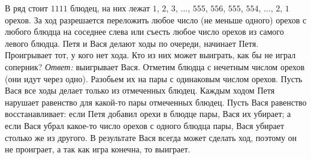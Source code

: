 \problem{}
В ряд стоит $1111$ блюдец, на них лежат
$1$, $2$, $3$, $\ldots$, $555$, $556$, $555$, $554$, $\ldots$, $2$, $1$ орехов.
За ход разрешается переложить любое число (не меньше одного) орехов с любого
блюдца на соседнее слева или съесть любое число орехов из самого левого блюдца.
Петя и Вася делают ходы по очереди, начинает Петя.
Проигрывает тот, у кого нет хода.
Кто из них может выиграть, как бы не играл соперник?
\solution
\emph{Ответ:} выигрывает Вася.
Отметим блюдца с нечетным числом орехов (они идут через одно).
Разобьем их на пары с одинаковым числом орехов.
Пусть Вася все ходы делает только из отмеченных блюдец.
Каждым ходом Петя нарушает равенство для какой-то пары отмеченных блюдец.
Пусть Вася равенство восстанавливает:
если Петя добавил орехи в блюдце пары, Вася их убирает;
а если Вася убрал какое-то число орехов с одного блюдца пары, Вася убирает
столько же из другого.
В результате Вася всегда может сделать ход, поэтому он не проиграет,
а так как игра конечна, то выиграет.
\endproblem
